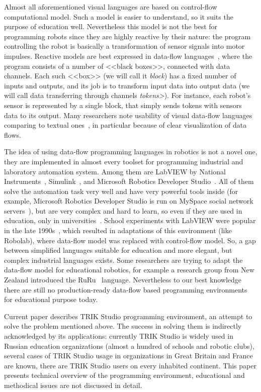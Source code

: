 \documentclass[conference]{IEEEtran}
\begin{document}
Almost all aforementioned visual languages are based on control-flow computational model. Such a model is easier to understand, so it suits the purpose of education well. Nevertheless this model is not the best for programming robots since they are highly reactive by their nature: the program controlling the robot is basically a transformation of sensor signals into motor impulses. Reactive models are best expressed in data-flow languages~\cite{johnston2004advances}, where the program consists of a number of <<black boxes>>, connected with data channels. Each such <<box>> (we will call it \textit{block}) has a fixed number of inputs and outputs, and its job is to transform input data into output data (we will call data transferring through channels \textit{tokens>}). For instance, each robot's sensor is represented by a single block, that simply sends tokens with sensors data to its output. Many researchers  note usability of visual data-flow languages comparing to textual ones~\cite{johnston2004advances}, in particular because of clear visualization of data flows.

The idea of using data-flow programming languages in robotics is not a novel one, they are implemented in almost every toolset for programming industrial and laboratory automation system. Among them are LabVIEW by National Instruments~\cite{kodosky1991visual}, Simulink~\cite{dabney2004mastering}, and Microsoft Robotics Developer Studio~\cite{jackson2007microsoft}. All of them solve the automation task very well and have very powerful tools inside (for example, Microsoft Robotics Developer Studio is run on MySpace social network servers~\cite{scherotter2009ccr}), but are very complex and hard to learn, so even if they are used in education, only in universities~\cite{stefanovic2011labview,yi2005labview}. School experiments with LabVIEW were popular in the late 1990s~\cite{cyr1997low,portsmore1999robolab}, which resulted in adaptations of this environment (like Robolab), where data-flow model was replaced with control-flow model. So, a gap between simplified languages suitable for education and more elegant, but complex industrial languages exists. Some researchers are trying to adapt the data-flow model for educational robotics, for example a research group from New Zealand introduced the RuRu~\cite{diprose2011ruru} language. Nevertheless to our best knowledge there are still no production-ready data-flow based programming environments for educational purpose today.

Current paper describes TRIK Studio programming environment, an attempt to solve the problem	 mentioned above. The success in solving them is indirectly acknowledged by its applications: currently TRIK Studio is widely used in Russian education organizations (almost a hundred of schools and robotic clubs), several cases of TRIK Studio usage in organizations in Great Britain and France are known, there are TRIK Studio users on every inhabited continent. This paper presents technical overview of the programming environment, educational and methodical issues are not discussed in detail.
\end{document}
